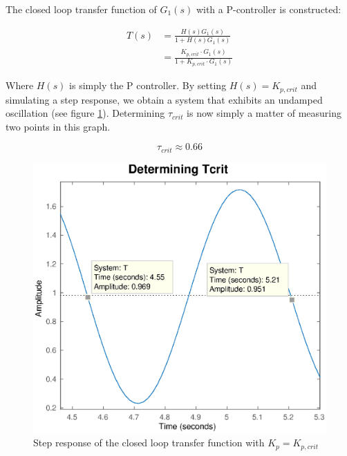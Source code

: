 The  closed  loop  transfer  function  of  $G_1(s)$  with  a  P-controller  is
constructed:

\begin{align}
    T(s) &= \frac{H(s)G_1(s)}{1 + H(s)G_1(s)}  \\
         &= \frac{K_{p,crit}\cdot G_1(s)}{1 + K_{p,crit}\cdot G_1(s)}
\end{align}

Where  $H(s)$  is  simply  the  P controller. By setting $H(s)=K_{p,crit}$ and
simulating a step  response,  we  obtain  a  system  that exhibits an undamped
oscillation (see  figure \ref{fig:Tt_PT1_tcrit}). Determining $\tau_{crit}$ is
now simply a matter of measuring two points in this graph.

\begin{equation}
    \tau_{crit} \approx 0.66
\end{equation}

\begin{figure}[b!]
    \centering
    \includegraphics[width=\imagewidth]{images/tcrit}
    \caption{Step response of the closed loop transfer function with $K_p=K_{p,crit}$}
    \label{fig:Tt_PT1_tcrit}
\end{figure}

